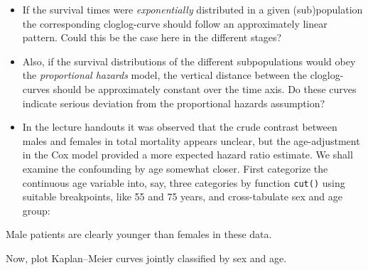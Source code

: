 \documentclass[
]{book}
\newenvironment{Shaded}{\begin{snugshade}}{\end{snugshade}}
\newcommand{\AttributeTok}[1]{\textcolor[rgb]{0.13,0.29,0.53}{#1}}
\newcommand{\ConstantTok}[1]{\textcolor[rgb]{0.56,0.35,0.01}{#1}}
\newcommand{\DecValTok}[1]{\textcolor[rgb]{0.00,0.00,0.81}{#1}}
\newcommand{\FunctionTok}[1]{\textcolor[rgb]{0.13,0.29,0.53}{\textbf{#1}}}
\newcommand{\NormalTok}[1]{#1}
\newcommand{\OtherTok}[1]{\textcolor[rgb]{0.56,0.35,0.01}{#1}}
\newcommand{\SpecialCharTok}[1]{\textcolor[rgb]{0.81,0.36,0.00}{\textbf{#1}}}
\begin{document}
\begin{itemize}
\item
  If the survival times were \emph{exponentially}
  distributed in a given (sub)population
  the corresponding cloglog-curve should follow an approximately linear pattern.
  Could this be the case here in the different stages?
\item
  Also, if the survival distributions of the different subpopulations would
  obey the \emph{proportional hazards} model, the vertical distance between the
  cloglog-curves should be approximately constant over the time axis.
  Do these curves indicate serious deviation from the proportional hazards assumption?
\item
  In the lecture handouts it was observed that
  the crude contrast between males and females in total mortality appears
  unclear, but the age-adjustment in the Cox model provided a more
  expected hazard ratio estimate.
  We shall examine the confounding by age somewhat closer.
  First categorize the continuous age variable
  into, say, three categories by function \texttt{cut()}
  using suitable breakpoints, like 55 and 75 years, and
  cross-tabulate sex and age group:
\end{itemize}

\begin{Shaded}
\end{Shaded}

Male patients are clearly younger than females in these data.

Now, plot Kaplan--Meier curves jointly classified by sex and age.
\end{document}
